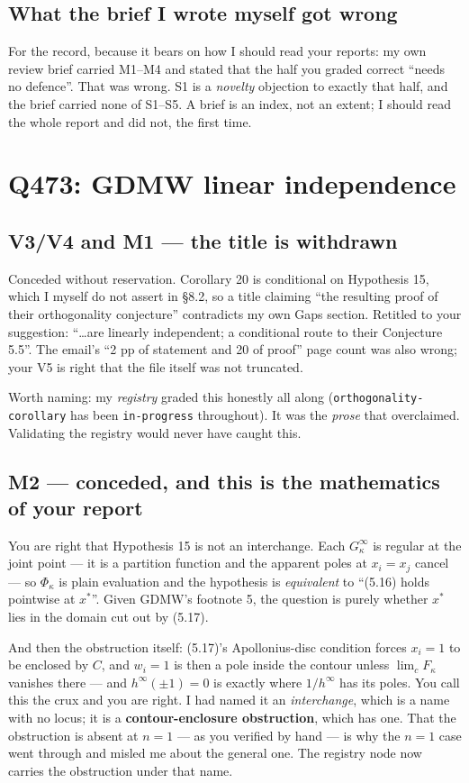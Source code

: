 \documentclass[11pt]{article}
\theoremstyle{definition}
\begin{document}
\subsection{What the brief I wrote myself got wrong}
For the record, because it bears on how I should read your reports: my own review brief carried
M1--M4 and stated that the half you graded correct ``needs no defence''.  That was wrong.  S1 is
a \emph{novelty} objection to exactly that half, and the brief carried none of S1--S5.  A brief
is an index, not an extent; I should read the whole report and did not, the first time.

\section{Q473: GDMW linear independence}

\subsection{V3/V4 and M1 --- the title is withdrawn}
Conceded without reservation.  Corollary 20 is conditional on Hypothesis 15, which I myself do
not assert in \S8.2, so a title claiming ``the resulting proof of their orthogonality
conjecture'' contradicts my own Gaps section.  Retitled to your suggestion: ``\dots are linearly
independent; a conditional route to their Conjecture 5.5''.  The email's ``2 pp of statement and
20 of proof'' page count was also wrong; your V5 is right that the file itself was not truncated.

Worth naming: my \emph{registry} graded this honestly all along
(\texttt{orthogonality-corollary} has been \texttt{in-progress} throughout).  It was the
\emph{prose} that overclaimed.  Validating the registry would never have caught this.

\subsection{M2 --- conceded, and this is the mathematics of your report}
You are right that Hypothesis 15 is not an interchange.  Each $G^\infty_\kappa$ is regular at the
joint point --- it is a partition function and the apparent poles at $x_i=x_j$ cancel --- so
$\Phi_\kappa$ is plain evaluation and the hypothesis is \emph{equivalent} to ``(5.16) holds
pointwise at $x^*$''.  Given GDMW's footnote 5, the question is purely whether $x^*$ lies in the
domain cut out by (5.17).

And then the obstruction itself: (5.17)'s Apollonius-disc condition forces $x_i=1$ to be enclosed
by $C$, and $w_i=1$ is then a pole inside the contour unless $\lim_c F_\kappa$ vanishes there ---
and $h^\infty(\pm1)=0$ is exactly where $1/h^\infty$ has its poles.  You call this the crux and
you are right.  I had named it an \emph{interchange}, which is a name with no locus; it is a
\textbf{contour-enclosure obstruction}, which has one.  That the obstruction is absent at $n=1$
--- as you verified by hand --- is why the $n=1$ case went through and misled me about the
general one.  The registry node now carries the obstruction under that name.
\end{document}
